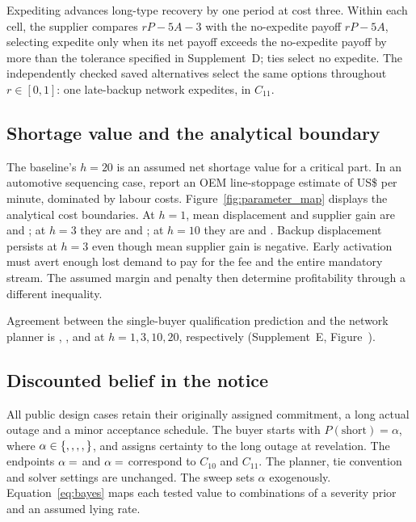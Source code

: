 \documentclass[preprint,11pt,authoryear]{elsarticle}
\begin{document}
Expediting advances long-type recovery by one period at cost three. Within each cell, the supplier compares $rP-5A-3$ with the no-expedite payoff $rP-5A$, selecting expedite only when its net payoff exceeds the no-expedite payoff by more than the tolerance specified in Supplement~D; ties select no expedite. The independently checked saved alternatives select the same options throughout $r\in[0,1]$: one late-backup network expedites, in $C_{11}$. 

\subsection{Shortage value and the analytical boundary}
The baseline's $h=20$ is an assumed net shortage value for a critical part. In an automotive sequencing case, \citet[Section 4]{kang2018sequencing} report an OEM line-stoppage estimate of US\$ per minute, dominated by labour costs. Figure~\ref{fig:parameter_map} displays the analytical cost boundaries. At $h=1$, mean displacement and supplier gain are  and ; at $h=3$ they are  and ; at $h=10$ they are  and . Backup displacement persists at $h=3$ even though mean supplier gain is negative. Early activation must avert enough lost demand to pay for the fee and the entire mandatory stream. The assumed margin and penalty then determine profitability through a different inequality.

Agreement between the single-buyer qualification prediction and the network planner is , ,  and  at $h=1,3,10,20$, respectively (Supplement~E, Figure~\windowSupplementNumber).

\subsection{Discounted belief in the notice}\label{sec:discounted_belief}
All  public design cases retain their originally assigned commitment, a long actual outage and a minor acceptance schedule. The buyer starts with $P(\mathrm{short})=\alpha$, where $\alpha\in\{\db{alpha0},\db{alpha1},\db{alpha2},\db{alpha3},\db{alpha4}\}$, and assigns certainty to the long outage at revelation. The endpoints $\alpha=\db{alpha0}$ and $\alpha=\db{alpha4}$ correspond to $C_{10}$ and $C_{11}$. The planner, tie convention and solver settings are unchanged. The sweep sets $\alpha$ exogenously. Equation~\eqref{eq:bayes} maps each tested value to combinations of a severity prior and an assumed lying rate.
\end{document}
